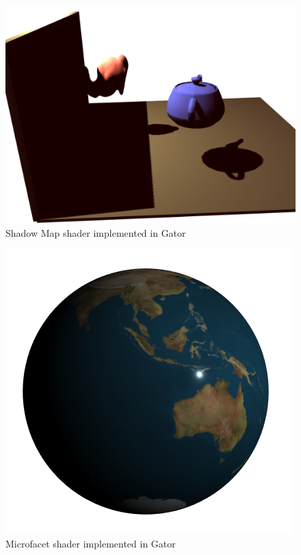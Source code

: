 {\begin{figure}
	\centering
	\includegraphics[width=.7\linewidth]{fig/shadowmap.png}
	\caption{Shadow Map shader implemented in Gator}
	\label{fig:shadowmap}
\end{figure}
\begin{figure}
	\centering
	\includegraphics[width=.7\linewidth]{fig/microfacet.png}
	\caption{Microfacet shader implemented in Gator}
	\label{fig:microfacet}
\end{figure}


}
